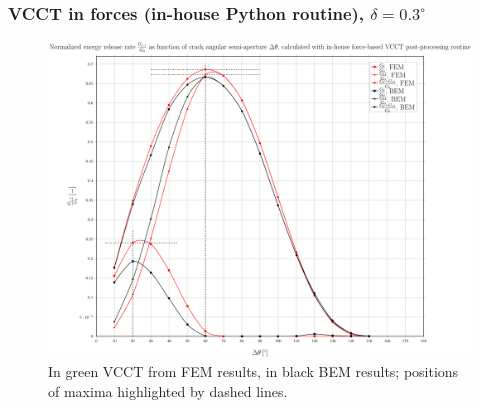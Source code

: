 \documentclass[first,firstsupp,lastsupp,handout,last,hyperref,table]{ETHclass}
\begin{document}
\begin{frame}
\frametitle{\small VCCT in forces (in-house Python routine), $\delta=0.3^{\circ}$}
\vspace{-0.5cm}
\centering
\captionsetup[figure]{font=scriptsize,labelfont=scriptsize}
\begin{figure}[!h]
\centering
\includegraphics[height=0.7\textheight]{2017-07-10_AbqRunSummary_SmallStrainD03_M-F-VCCT_Summary.pdf}
  \caption{\scriptsize In green VCCT from FEM results, in black BEM results; positions of maxima highlighted by dashed lines.}
  \label{fig:res1}
\end{figure}
\end{frame}
\end{document}
